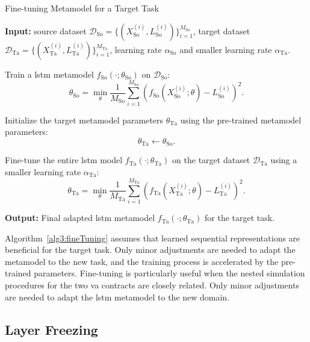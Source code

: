 \begin{algorithm}[ht!]
\caption{Fine-tuning Metamodel for a Target Task}
\begin{algorithmic}[1] \label{alg3:fineTuning}
    \STATE \textbf{Input:} source dataset $\mathcal{D}_{\text{So}} = \{(X_{\text{So}}^{(i)}, L_{\text{So}}^{(i)})\}_{i=1}^{M_{\text{So}}}$, target dataset $\mathcal{D}_{\text{Ta}} = \{(X_{\text{Ta}}^{(i)}, L_{\text{Ta}}^{(i)})\}_{i=1}^{M_{\text{Ta}}}$, learning rate $\alpha_{\text{So}}$ and smaller learning rate $\alpha_{\text{Ta}}$.
    
    \STATE Train a \gls{lstm} metamodel $f_{\text{So}}(\cdot; \theta_{\text{So}})$ on $\mathcal{D}_{\text{So}}$:
    \begin{equation}
        \theta_{\text{So}} = \min_{\theta} \frac{1}{M_{\text{So}}} \sum_{i=1}^{M_{\text{So}}} \left( f_{\text{So}}(X_{\text{So}}^{(i)}; \theta) - L_{\text{So}}^{(i)} \right)^2.
    \end{equation}

    \STATE Initialize the target metamodel parameters $\theta_{\text{Ta}}$ using the pre-trained metamodel parameters:
    \[
    \theta_{\text{Ta}} \gets \theta_{\text{So}}.
    \]
    
    \STATE Fine-tune the entire \gls{lstm} model $f_{\text{Ta}}(\cdot; \theta_{\text{Ta}})$ on the target dataset $\mathcal{D}_{\text{Ta}}$ using a smaller learning rate $\alpha_{\text{Ta}}$:
    \begin{equation}
        \theta_{\text{Ta}} = \min_{\theta} \frac{1}{M_{\text{Ta}}} \sum_{i=1}^{M_{\text{Ta}}} \left( f_{\text{Ta}}(X_{\text{Ta}}^{(i)}; \theta) - L_{\text{Ta}}^{(i)} \right)^2.
    \end{equation}
    
    \STATE \textbf{Output:} Final adapted \gls{lstm} metamodel $f_{\text{Ta}}(\cdot; \theta_{\text{Ta}})$ for the target task.
\end{algorithmic}
\end{algorithm}

Algorithm~\ref{alg3:fineTuning} assumes that learned sequential representations are beneficial for the target task.
Only minor adjustments are needed to adapt the metamodel to the new task, and the training process is accelerated by the pre-trained parameters.
Fine-tuning is particularly useful when the nested simulation procedures for the two \gls{va} contracts are closely related.
Only minor adjustments are needed to adapt the \gls{lstm} metamodel to the new domain.

\subsection{Layer Freezing}

